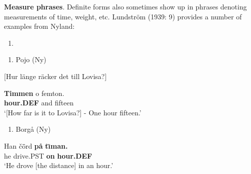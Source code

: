 \textbf{Measure phrases}. Definite forms also sometimes show up in phrases denoting measurements of time, weight, etc. Lundström (1939: 9) provides a number of examples from Nyland: 

\begin{enumerate} %
\item 
\end{enumerate} %
\setcounter{listLFOxcviiileveli}{0}
\begin{enumerate} %
\item 
Pojo (Ny)

\end{enumerate} %
[Hur länge räcker det till Lovisa?]


\ea\label{}
\gll \textbf{Timmen} o  femton.\\


\textbf{hour.DEF} and  fifteen\\ %


‘[How far is it to Lovisa?] - One hour fifteen.’
\z


\begin{enumerate} %
\item 
Borgå (Ny)

\end{enumerate} %
\ea\label{}
\gll Han  č\={ö}rd  \textbf{på} \textbf{t}\textbf{\=\i}\textbf{man.}\\


he  drive.PST  \textbf{on} \textbf{hour.DEF}\\ %


‘He drove [the distance] in an hour.’
\z


